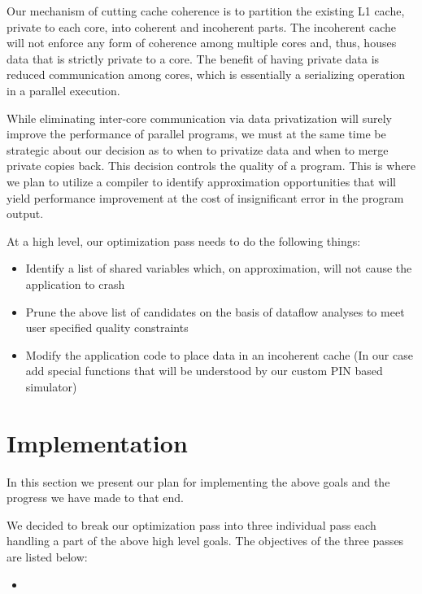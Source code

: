 \documentclass[12pt,conference]{IEEEtran}
\begin{document}
Our mechanism of cutting cache coherence is to partition the
existing L1 cache, private to each core, into coherent and 
incoherent parts. The incoherent cache will not
enforce any form of coherence among multiple cores and, thus,
houses data that is strictly private to a core. The benefit of having private
data is reduced communication among cores, which is essentially a 
serializing operation in a parallel execution. 

While eliminating inter-core communication via data privatization
will surely improve the performance of parallel programs, we must at the same time
be strategic about our decision as to when to privatize data and when to merge private copies
back. This 
decision controls the quality of a program. This is where we plan to 
utilize a compiler to identify approximation opportunities that will 
yield performance improvement at the cost of insignificant error in the
program output.


At a high level, our optimization pass needs to do the following things:
\begin{itemize}
\item Identify a list of shared variables which, on approximation, will not
cause the application to crash
\item Prune the above list of candidates on the basis of dataflow analyses to 
meet user specified quality constraints
\item Modify the application code to place data in an incoherent cache (In our case
add special functions that will be understood by our custom PIN based simulator)
\end{itemize}

\section{Implementation}

In this section we present our plan for implementing the above goals and
the progress we have made to that end.

We decided to break our optimization pass into three individual pass each handling
a part of the above high level goals. The objectives of the three passes are listed 
below:
\begin{itemize}
\item 
\end{itemize}
\end{document}
